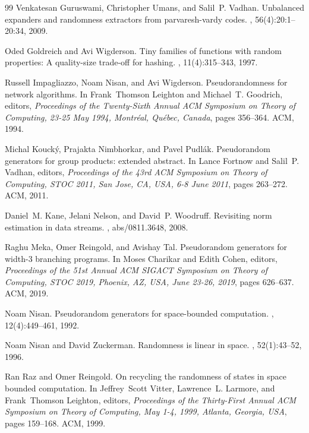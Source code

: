 \documentclass[10pt,a4paper]{article}
\begin{document}
\begin{thebibliography}{99}
Venkatesan Guruswami, Christopher Umans, and Salil~P. Vadhan.
\newblock Unbalanced expanders and randomness extractors from parvaresh-vardy
  codes.
, 56(4):20:1--20:34, 2009.

Oded Goldreich and Avi Wigderson.
\newblock Tiny families of functions with random properties: {A} quality-size
  trade-off for hashing.
, 11(4):315--343, 1997.

Russell Impagliazzo, Noam Nisan, and Avi Wigderson.
\newblock Pseudorandomness for network algorithms.
\newblock In Frank~Thomson Leighton and Michael~T. Goodrich, editors, {\em
  Proceedings of the Twenty-Sixth Annual {ACM} Symposium on Theory of
  Computing, 23-25 May 1994, Montr{\'{e}}al, Qu{\'{e}}bec, Canada}, pages
  356--364. {ACM}, 1994.

Michal Kouck{\'{y}}, Prajakta Nimbhorkar, and Pavel Pudl{\'{a}}k.
\newblock Pseudorandom generators for group products: extended abstract.
\newblock In Lance Fortnow and Salil~P. Vadhan, editors, {\em Proceedings of
  the 43rd {ACM} Symposium on Theory of Computing, {STOC} 2011, San Jose, CA,
  USA, 6-8 June 2011}, pages 263--272. {ACM}, 2011.

Daniel~M. Kane, Jelani Nelson, and David~P. Woodruff.
\newblock Revisiting norm estimation in data streams.
, abs/0811.3648, 2008.

Raghu Meka, Omer Reingold, and Avishay Tal.
\newblock Pseudorandom generators for width-3 branching programs.
\newblock In Moses Charikar and Edith Cohen, editors, {\em Proceedings of the
  51st Annual {ACM} {SIGACT} Symposium on Theory of Computing, {STOC} 2019,
  Phoenix, AZ, USA, June 23-26, 2019}, pages 626--637. {ACM}, 2019.

Noam Nisan.
\newblock Pseudorandom generators for space-bounded computation.
, 12(4):449--461, 1992.

Noam Nisan and David Zuckerman.
\newblock Randomness is linear in space.
, 52(1):43--52, 1996.

Ran Raz and Omer Reingold.
\newblock On recycling the randomness of states in space bounded computation.
\newblock In Jeffrey~Scott Vitter, Lawrence~L. Larmore, and Frank~Thomson
  Leighton, editors, {\em Proceedings of the Thirty-First Annual {ACM}
  Symposium on Theory of Computing, May 1-4, 1999, Atlanta, Georgia, {USA}},
  pages 159--168. {ACM}, 1999.


\end{thebibliography}
\end{document}
